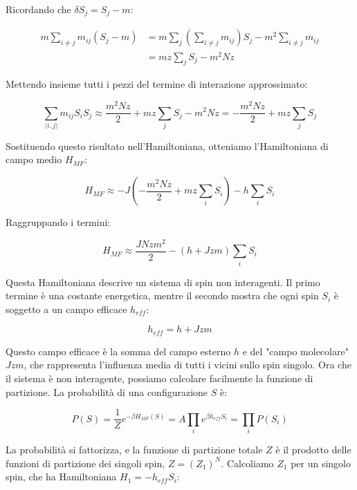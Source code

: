 Ricordando che $\delta S_j = S_j - m$:

\begin{align}
m \sum_{i \neq j} m_{ij} (S_j - m) &= m \sum_j \left( \sum_{i \neq j} m_{ij} \right) S_j - m^2 \sum_{i \neq j} m_{ij} \nonumber \\  &= m z \sum_j S_j - m^2 N z \label{eq:ch16_31}
\end{align}

Mettendo insieme tutti i pezzi del termine di interazione approssimato:

\begin{equation} \label{eq:ch16_32}
\sum_{\langle i,j \rangle} m_{ij} S_i S_j \approx \frac{m^2 N z}{2} + m z \sum_j S_j - m^2 N z = - \frac{m^2 N z}{2} + m z \sum_j S_j
\end{equation}

Sostituendo questo risultato nell'Hamiltoniana, otteniamo l'Hamiltoniana di campo medio $H_{MF}$:

\begin{equation} \label{eq:ch16_33}
H_{MF} \approx -J \left( - \frac{m^2 N z}{2} + m z \sum_i S_i \right) - h \sum_i S_i
\end{equation}

Raggruppando i termini:

\begin{equation} \label{eq:ch16_34}
H_{MF} \approx \frac{J N z m^2}{2} - (h + J z m) \sum_i S_i
\end{equation}

Questa Hamiltoniana descrive un sistema di spin non interagenti. Il primo termine è una costante energetica, mentre il secondo mostra che ogni spin $S_i$ è soggetto a un campo efficace $h_{eff}$:

\begin{equation} \label{eq:ch16_35}
h_{eff} = h + J z m
\end{equation}

Questo campo efficace è la somma del campo esterno $h$ e del "campo molecolare" $Jzm$, che rappresenta l'influenza media di tutti i vicini sullo spin singolo.
Ora che il sistema è non interagente, possiamo calcolare facilmente la funzione di partizione.
La probabilità di una configurazione $S$ è:

\begin{equation} \label{eq:ch16_36}
P(S) = \frac{1}{Z} e^{-\beta H_{MF}(S)} = A \prod_i e^{\beta h_{eff} S_i} = \prod_i P(S_i)
\end{equation}

La probabilità si fattorizza, e la funzione di partizione totale $Z$ è il prodotto delle funzioni di partizione dei singoli spin, $Z = (Z_1)^N$. Calcoliamo $Z_1$ per un singolo spin, che ha Hamiltoniana $H_1 = -h_{eff}S_i$:

